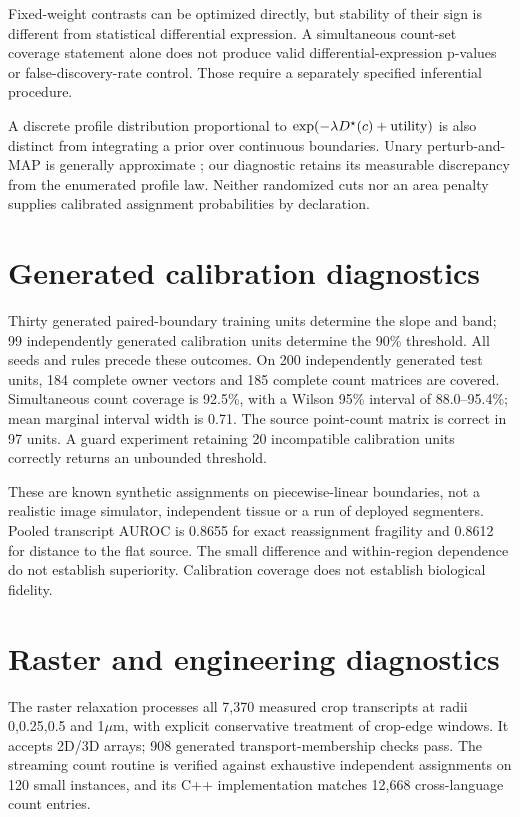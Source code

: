 \documentclass[10pt,letterpaper]{article}
\begin{document}
Fixed-weight contrasts can be optimized directly, but stability of their sign is different from statistical differential expression. A simultaneous count-set coverage statement alone does not produce valid differential-expression p-values or false-discovery-rate control. Those require a separately specified inferential procedure.

A discrete profile distribution proportional to \(\exp(-\lambda D^\star(c)+\text{utility})\) is also distinct from integrating a prior over continuous boundaries. Unary perturb-and-MAP is generally approximate \cite{papandreou}; our diagnostic retains its measurable discrepancy from the enumerated profile law. Neither randomized cuts nor an area penalty supplies calibrated assignment probabilities by declaration.

\section{Generated calibration diagnostics}
Thirty generated paired-boundary training units determine the slope and band; 99 independently generated calibration units determine the 90\% threshold. All seeds and rules precede these outcomes. On 200 independently generated test units, 184 complete owner vectors and 185 complete count matrices are covered. Simultaneous count coverage is 92.5\%, with a Wilson 95\% interval of 88.0--95.4\%; mean marginal interval width is 0.71. The source point-count matrix is correct in 97 units. A guard experiment retaining 20 incompatible calibration units correctly returns an unbounded threshold.

These are known synthetic assignments on piecewise-linear boundaries, not a realistic image simulator, independent tissue or a run of deployed segmenters. Pooled transcript AUROC is 0.8655 for exact reassignment fragility and 0.8612 for distance to the flat source. The small difference and within-region dependence do not establish superiority. Calibration coverage does not establish biological fidelity.

\section{Raster and engineering diagnostics}
The raster relaxation processes all 7,370 measured crop transcripts at radii 0,0.25,0.5 and 1$\mu$m, with explicit conservative treatment of crop-edge windows. It accepts 2D/3D arrays; 908 generated transport-membership checks pass. The streaming count routine is verified against exhaustive independent assignments on 120 small instances, and its C++ implementation matches 12,668 cross-language count entries.
\end{document}

